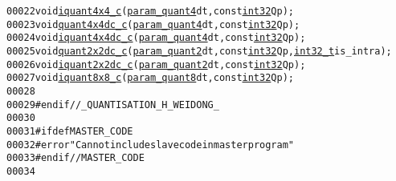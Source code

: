 \begin{footnotesize}
\begin{alltt}
00022 \textcolor{keywordtype}{void} \hyperlink{_quantisation_8cpp_a5985492c5cf012e5d7051f11fa86821c}{iquant4x4_c}(\hyperlink{_quantisation_8h_aaf238cae50a8b754d811c856535578b4}{param_quant4} dt, \textcolor{keyword}{const} \hyperlink{_types_8h_a43d43196463bde49cb067f5c20ab8481}{int32} Qp);
00023 \textcolor{keywordtype}{void} \hyperlink{_quantisation_8cpp_aeb2be591bcf2be1d22c5bb6a23537c78}{quant4x4dc_c}(\hyperlink{_quantisation_8h_aaf238cae50a8b754d811c856535578b4}{param_quant4} dt, \textcolor{keyword}{const} \hyperlink{_types_8h_a43d43196463bde49cb067f5c20ab8481}{int32} Qp);
00024 \textcolor{keywordtype}{void} \hyperlink{_quantisation_8cpp_a480f9f1c650257964853863d5683ed34}{iquant4x4dc_c}(\hyperlink{_quantisation_8h_aaf238cae50a8b754d811c856535578b4}{param_quant4} dt, \textcolor{keyword}{const} \hyperlink{_types_8h_a43d43196463bde49cb067f5c20ab8481}{int32} Qp);
00025 \textcolor{keywordtype}{void} \hyperlink{_quantisation_8cpp_a805f7902eccf615fd707997d06e0c1ff}{quant2x2dc_c}(\hyperlink{_quantisation_8h_aa2419725a4ad76a3137ed57a1789cf8e}{param_quant2} dt, \textcolor{keyword}{const} \hyperlink{_types_8h_a43d43196463bde49cb067f5c20ab8481}{int32} Qp, \hyperlink{_types_8h_a115ba3a1b24a8702355c5dbd61ce01e0}{int32_t} is\_intra);
00026 \textcolor{keywordtype}{void} \hyperlink{_quantisation_8cpp_ad8c9813079b1dac9e7c7ab3d40a9a212}{iquant2x2dc_c}(\hyperlink{_quantisation_8h_aa2419725a4ad76a3137ed57a1789cf8e}{param_quant2} dt, \textcolor{keyword}{const} \hyperlink{_types_8h_a43d43196463bde49cb067f5c20ab8481}{int32} Qp);
00027 \textcolor{keywordtype}{void} \hyperlink{_quantisation_8cpp_a6096528e049a8f3c2a463926db773e42}{iquant8x8_c}(\hyperlink{_quantisation_8h_a8bf84fa166851783a628e4a4e5a48888}{param_quant8} dt, \textcolor{keyword}{const} \hyperlink{_types_8h_a43d43196463bde49cb067f5c20ab8481}{int32} Qp);
00028 
00029 \textcolor{preprocessor}{#endif //\_QUANTISATION\_H\_WEIDONG\_}
00030 \textcolor{preprocessor}{}
00031 \textcolor{preprocessor}{#ifdef MASTER\_CODE}
00032 \textcolor{preprocessor}{}\textcolor{preprocessor}{#error "Can not include slave code in master program"}
00033 \textcolor{preprocessor}{}\textcolor{preprocessor}{#endif // MASTER\_CODE}
00034 \textcolor{preprocessor}{}
\end{alltt}\end{footnotesize}
